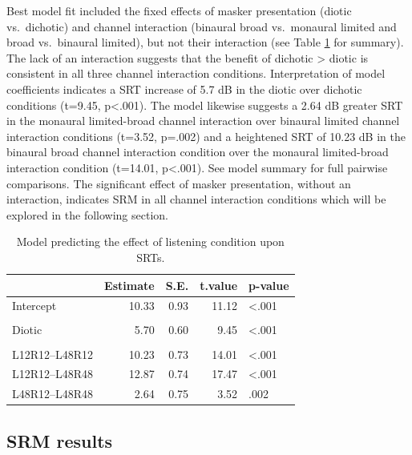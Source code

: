 \documentclass[
]{article}
\begin{document}
Best model fit included the fixed effects of masker presentation (diotic vs.~dichotic) and channel interaction (binaural broad vs.~monaural limited and broad vs.~binaural limited), but not their interaction (see Table \ref{tab:srt-model-sum} for summary). The lack of an interaction suggests that the benefit of dichotic \textgreater{} diotic is consistent in all three channel interaction conditions. Interpretation of model coefficients indicates a SRT increase of 5.7 dB in the diotic over dichotic conditions (t=9.45, p\textless.001). The model likewise suggests a 2.64 dB greater SRT in the monaural limited-broad channel interaction over binaural limited channel interaction conditions (t=3.52, p=.002) and a heightened SRT of 10.23 dB in the binaural broad channel interaction condition over the monaural limited-broad interaction condition (t=14.01, p\textless.001). See model summary for full pairwise comparisons. The significant effect of masker presentation, without an interaction, indicates SRM in all channel interaction conditions which will be explored in the following section.

\begin{table}[!h]

\caption{\label{tab:srt-model-sum}Model predicting the effect of listening condition upon SRTs.}
\centering
\begin{tabular}[t]{lrrrl}
\toprule
  & Estimate & S.E. & t.value & p-value\\
\midrule
Intercept & 10.33 & 0.93 & 11.12 & <.001\\
\addlinespace[0.3em]
\multicolumn{5}{l}{\textbf{Masker}}\\
\hspace{1em}Diotic & 5.70 & 0.60 & 9.45 & <.001\\
\addlinespace[0.3em]
\multicolumn{5}{l}{\textbf{Channel Interaction}}\\
\hspace{1em}L12R12--L48R12 & 10.23 & 0.73 & 14.01 & <.001\\
\hspace{1em}L12R12--L48R48 & 12.87 & 0.74 & 17.47 & <.001\\
\hspace{1em}L48R12--L48R48 & 2.64 & 0.75 & 3.52 & .002\\
\bottomrule
\end{tabular}
\end{table}

\hypertarget{srm-results}{%
\subsection{SRM results}\label{srm-results}}
\end{document}

